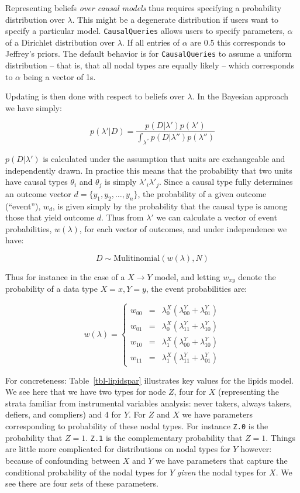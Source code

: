 \documentclass[
  11pt,
  article]{jss}
\begin{document}
Representing beliefs \emph{over causal models} thus requires specifying
a probability distribution over \(\lambda\). This might be a degenerate
distribution if users want to specify a particular model.
\texttt{CausalQueries} allows users to specify parameters, \(\alpha\) of
a Dirichlet distribution over \(\lambda\). If all entries of \(\alpha\)
are 0.5 this corresponds to Jeffrey's priors. The default behavior is
for \texttt{CausalQueries} to assume a uniform distribution -- that is,
that all nodal types are equally likely -- which corresponds to
\(\alpha\) being a vector of 1s.

Updating is then done with respect to beliefs over \(\lambda\). In the
Bayesian approach we have simply:

\[p(\lambda'|D) = \frac{p(D|\lambda')p(\lambda')}{\int_{\lambda^{''}} p(D|\lambda'')p(\lambda'')}\]

\(p(D|\lambda')\) is calculated under the assumption that units are
exchangeable and independently drawn. In practice this means that the
probability that two units have causal types \(\theta_i\) and
\(\theta_j\) is simply \(\lambda'_i\lambda'_j\). Since a causal type
fully determines an outcome vector \(d = \{y_1, y_2,\dots,y_n\}\), the
probability of a given outcome (``event''), \(w_d\), is given simply by
the probability that the causal type is among those that yield outcome
\(d\). Thus from \(\lambda'\) we can calculate a vector of event
probabilities, \(w(\lambda)\), for each vector of outcomes, and under
independence we have:

\[D \sim \text{Mulitinomial}(w(\lambda), N)\]

Thus for instance in the case of a \(X \rightarrow Y\) model, and
letting \(w_{xy}\) denote the probability of a data type \(X=x, Y=y\),
the event probabilities are:

\[w(\lambda) = \left\{\begin{array}{ccc} w_{00} & = & \lambda^X_0(\lambda^Y_{00} + \lambda^Y_{01})\\ 
w_{01} & = & \lambda^X_0(\lambda^Y_{11} + \lambda^Y_{10})\\
w_{10} & = & \lambda^X_1(\lambda^Y_{00} + \lambda^Y_{10})\\
w_{11} & = & \lambda^X_1(\lambda^Y_{11} + \lambda^Y_{01})\end{array} \right.\]

For concreteness: Table~\ref{tbl-lipidspar} illustrates key values for
the lipids model. We see here that we have two types for node \(Z\),
four for \(X\) (representing the strata familiar from instrumental
variables analysis: never takers, always takers, defiers, and compliers)
and 4 for \(Y\). For \(Z\) and \(X\) we have parameters corresponding to
probability of these nodal types. For instance \texttt{Z.0} is the
probability that \(Z=1\). \texttt{Z.1} is the complementary probability
that \(Z=1\). Things are little more complicated for distributions on
nodal types for \(Y\) however: because of confounding between \(X\) and
\(Y\) we have parameters that capture the conditional probability of the
nodal types for \(Y\) \emph{given} the nodal types for \(X\). We see
there are four sets of these parameters.
\end{document}
